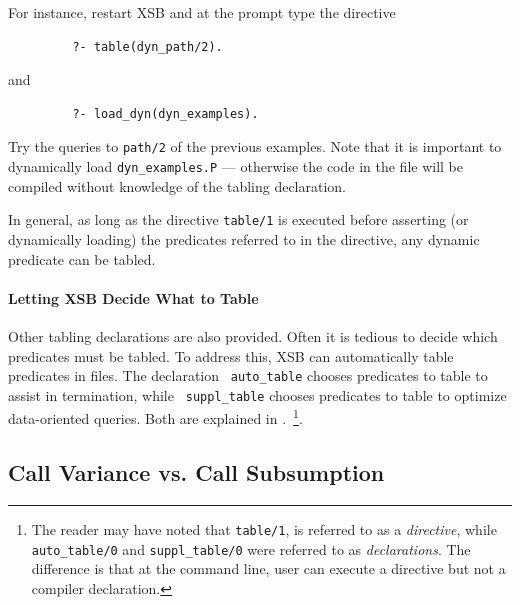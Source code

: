 \begin{exercise}
For instance, restart XSB and at the prompt type the directive
\begin{verbatim}
         ?- table(dyn_path/2).
\end{verbatim}
and 
\begin{verbatim}
         ?- load_dyn(dyn_examples).
\end{verbatim}
Try the queries to {\tt path/2} of the previous examples.  Note that
it is important to dynamically load {\tt dyn\_examples.P} ---
otherwise the code in the file will be compiled without knowledge of
the tabling declaration.\fillBox
\end{exercise}

In general, as long as the directive {\tt table/1} is executed before
asserting (or dynamically loading) the predicates referred to in the
directive, any dynamic predicate can be tabled.

\paragraph*{Letting XSB Decide What to Table}
Other tabling declarations are also provided.  Often it is tedious to
decide which predicates must be tabled.  To address this, XSB can
automatically table predicates in files.  The declaration {\tt
  auto\_table} chooses predicates to table
to assist in termination, while {\tt
  suppl\_table} chooses predicates to
table to optimize data-oriented queries.  Both are explained in
.~\footnote{The reader may have noted that
  {\tt table/1}, is referred to as a \emph{directive}, while {\tt
    auto\_table/0} and {\tt suppl\_table/0} were referred to as
  \emph{declarations}.  The difference is that at the command line,
  user can execute a directive but not a compiler declaration.}.


\subsection{Call Variance vs. Call Subsumption}
\label{sec:SimilarityMeasures}

